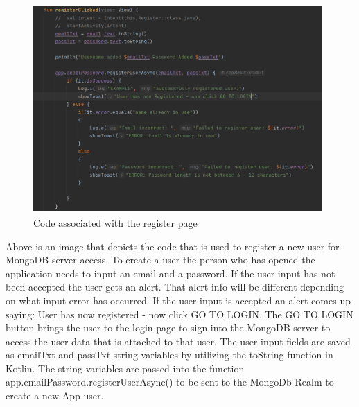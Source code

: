 \begin{figure}[H]
    \centering
    \includegraphics[width=11cm, height= 8cm]{img/registerCode.PNG}
    \caption{Code associated with the register page}
    \label{fig:altas config}
\end{figure}
Above is an image that depicts the code that is used to register a new user for MongoDB server access. To create a user the person who has opened the application needs to input an email and a password. If the user input has not been accepted the user gets an alert. That alert info will be different depending on what input error has occurred. If the user input is accepted an alert comes up saying: User has now registered - now click GO TO LOGIN. The GO TO LOGIN button brings the user to the login page to sign into the MongoDB server to access the user data that is attached to that user. 
\newline
The user input fields are saved as emailTxt and passTxt string variables by utilizing the toString function in Kotlin. The string variables are passed into the function app.emailPassword.registerUserAsync() to be sent to the MongoDb Realm to create a new App user.
